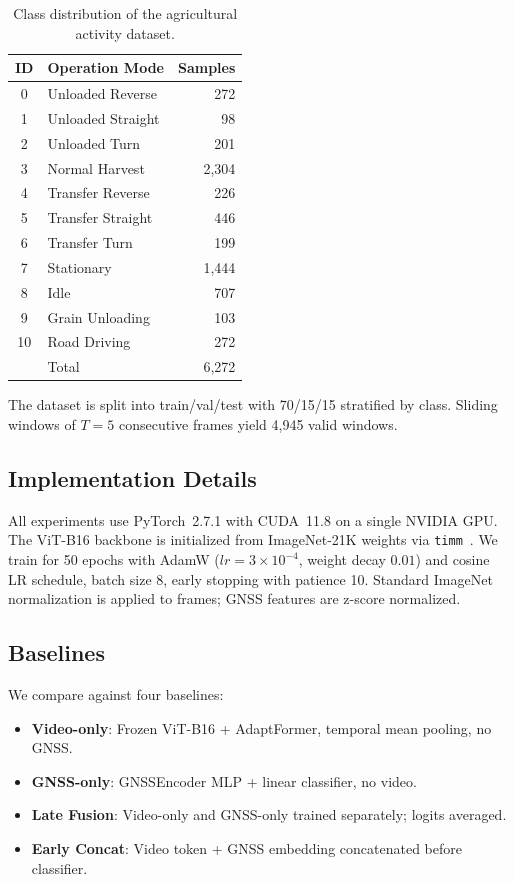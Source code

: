 \documentclass[10pt,twocolumn]{article}
\begin{document}
\begin{table}[h]
\centering
\caption{Class distribution of the agricultural activity dataset.}
\label{tab:class_dist}
\begin{tabular}{clr}
\toprule
ID & Operation Mode & Samples \\
\midrule
0 & Unloaded Reverse & 272 \\
1 & Unloaded Straight & 98 \\
2 & Unloaded Turn & 201 \\
3 & Normal Harvest & 2,304 \\
4 & Transfer Reverse & 226 \\
5 & Transfer Straight & 446 \\
6 & Transfer Turn & 199 \\
7 & Stationary & 1,444 \\
8 & Idle & 707 \\
9 & Grain Unloading & 103 \\
10 & Road Driving & 272 \\
\midrule
& Total & 6,272 \\
\bottomrule
\end{tabular}
\end{table}

The dataset is split into train/val/test with 70/15/15 stratified by class. Sliding windows of $T=5$ consecutive frames yield 4,945 valid windows.

\subsection{Implementation Details}
All experiments use PyTorch~2.7.1 with CUDA~11.8 on a single NVIDIA GPU. The ViT-B16 backbone is initialized from ImageNet-21K weights via \texttt{timm}~\cite{rw2019timm}. We train for 50 epochs with AdamW ($lr=3\times10^{-4}$, weight decay $0.01$) and cosine LR schedule, batch size 8, early stopping with patience 10. Standard ImageNet normalization is applied to frames; GNSS features are z-score normalized.

\subsection{Baselines}
We compare against four baselines:
\begin{itemize}
  \item \textbf{Video-only}: Frozen ViT-B16 + AdaptFormer, temporal mean pooling, no GNSS.
  \item \textbf{GNSS-only}: GNSSEncoder MLP + linear classifier, no video.
  \item \textbf{Late Fusion}: Video-only and GNSS-only trained separately; logits averaged.
  \item \textbf{Early Concat}: Video token + GNSS embedding concatenated before classifier.
\end{itemize}
\end{document}
